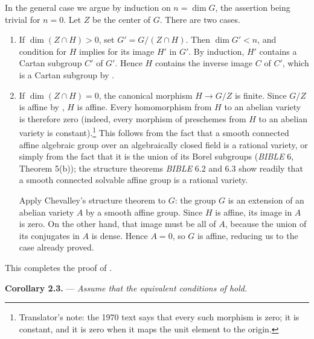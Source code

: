 In the general case we argue by induction on \(n=\dim G\), the
assertion being trivial for \(n=0\). Let \(Z\) be the center of
\(G\). There are two cases.

\begin{enumerate}
\item[\(1^\circ\)]  If \(\dim(Z\cap H)>0\), set
  \(G'=G/(Z\cap H)\). Then \(\dim G'<n\), and condition  for
  \(H\) implies  for its image \(H'\) in \(G'\).
  By induction, \(H'\) contains a Cartan subgroup \(C'\) of \(G'\).
  Hence \(H\) contains the inverse image \(C\) of \(C'\), which is a
  Cartan subgroup by .

\item[\(2^\circ\)]  If \(\dim(Z\cap H)=0\), the canonical morphism
  \(H\to G/Z\) is finite. Since \(G/Z\) is affine by , \(H\)
  is affine. Every homomorphism from \(H\) to an abelian variety is
  therefore zero (indeed, every morphism of preschemes from \(H\) to
  an abelian variety is constant).\footnote{Translator's note: the 1970
  text says that every such morphism is zero; it is constant, and it is
  zero when it maps the unit element to the origin.} This follows from the fact that a
  smooth connected affine algebraic group over an algebraically
  closed field is a rational variety, or simply from the fact that
  it is the union of its Borel subgroups (\emph{BIBLE} 6,
  Theorem 5(b)); the structure theorems \emph{BIBLE} 6.2 and 6.3
  show readily that a smooth connected solvable affine group is a
  rational variety.

  Apply Chevalley's structure theorem to \(G\): the group \(G\) is
  an extension of an abelian variety \(A\) by a smooth affine group.
  Since \(H\) is affine, its image in \(A\) is zero. On the other
  hand, that image must be all of \(A\), because the union of its
  conjugates in \(A\) is dense. Hence \(A=0\), so \(G\) is affine,
  reducing us to the case already proved.
\end{enumerate}

This completes the proof of .

\medskip
\noindent{}\textbf{Corollary 2.3.} ---
\textit{Assume that the equivalent conditions of  hold.}

